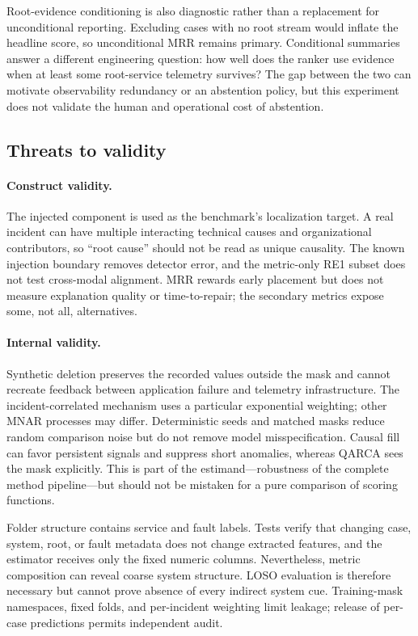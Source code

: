 \documentclass[runningheads]{llncs}
\begin{document}
Root-evidence conditioning is also diagnostic rather than a replacement for
unconditional reporting. Excluding cases with no root stream would inflate the
headline score, so unconditional MRR remains primary. Conditional summaries
answer a different engineering question: how well does the ranker use evidence
when at least some root-service telemetry survives? The gap between the two can
motivate observability redundancy or an abstention policy, but this experiment
does not validate the human and operational cost of abstention.

\subsection{Threats to validity}

\paragraph{Construct validity.}
The injected component is used as the benchmark's localization target. A real
incident can have multiple interacting technical causes and organizational
contributors, so ``root cause'' should not be read as unique causality. The
known injection boundary removes detector error, and the metric-only RE1 subset
does not test cross-modal alignment. MRR rewards early placement but does not
measure explanation quality or time-to-repair; the secondary metrics expose
some, not all, alternatives.

\paragraph{Internal validity.}
Synthetic deletion preserves the recorded values outside the mask and cannot
recreate feedback between application failure and telemetry infrastructure.
The incident-correlated mechanism uses a particular exponential weighting;
other MNAR processes may differ. Deterministic seeds and matched masks reduce
random comparison noise but do not remove model misspecification. Causal fill
can favor persistent signals and suppress short anomalies, whereas QARCA sees
the mask explicitly. This is part of the estimand---robustness of the complete
method pipeline---but should not be mistaken for a pure comparison of scoring
functions.

Folder structure contains service and fault labels. Tests verify that changing
case, system, root, or fault metadata does not change extracted features, and
the estimator receives only the fixed numeric columns. Nevertheless, metric
composition can reveal coarse system structure. LOSO evaluation is therefore
necessary but cannot prove absence of every indirect system cue. Training-mask
namespaces, fixed folds, and per-incident weighting limit leakage; release of
per-case predictions permits independent audit.
\end{document}
